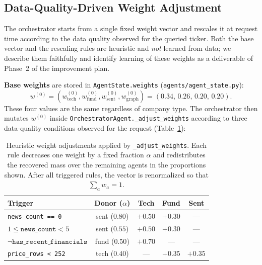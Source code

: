 \documentclass[conference]{IEEEtran}
\begin{document}
\subsection{Data-Quality-Driven Weight Adjustment}\label{sec:weights}

The orchestrator starts from a single fixed weight vector and rescales it at request time according to the data quality observed for the queried ticker. Both the base vector and the rescaling rules are heuristic and \emph{not} learned from data; we describe them faithfully and identify learning of these weights as a deliverable of Phase~2 of the improvement plan.

\textbf{Base weights} are stored in \texttt{AgentState.weights} (\texttt{agents/agent\_state.py}):
\begin{equation}
w^{(0)} = (w^{(0)}_{\mathrm{tech}}, w^{(0)}_{\mathrm{fund}}, w^{(0)}_{\mathrm{sent}}, w^{(0)}_{\mathrm{graph}}) = (0.34,\, 0.26,\, 0.20,\, 0.20).
\label{eq:base_weights}
\end{equation}
These four values are the same regardless of company type. The orchestrator then mutates $w^{(0)}$ inside \texttt{OrchestratorAgent.\_adjust\_weights} according to three data-quality conditions observed for the request (Table~\ref{tab:weight_adjustments}):

\begin{table}[htbp]
\centering
\caption{Heuristic weight adjustments applied by \texttt{\_adjust\_weights}. Each rule decreases one weight by a fixed fraction $\alpha$ and redistributes the recovered mass over the remaining agents in the proportions shown. After all triggered rules, the vector is renormalized so that $\sum_a w_a = 1$.}
\label{tab:weight_adjustments}
\small
\begin{tabular}{p{2.6cm}cccc}
\toprule
\textbf{Trigger} & \textbf{Donor} ($\alpha$) & \textbf{Tech} & \textbf{Fund} & \textbf{Sent} \\
\midrule
\texttt{news\_count == 0}            & sent ($0.80$) & $+0.50$ & $+0.30$ & --- \\
$1 \le \texttt{news\_count} < 5$     & sent ($0.55$) & $+0.50$ & $+0.30$ & --- \\
$\neg\texttt{has\_recent\_financials}$ & fund ($0.50$) & $+0.70$ & --- & --- \\
\texttt{price\_rows < 252}           & tech ($0.40$) & --- & $+0.35$ & $+0.35$ \\
\bottomrule
\end{tabular}
\normalsize
\end{table}
\end{document}
